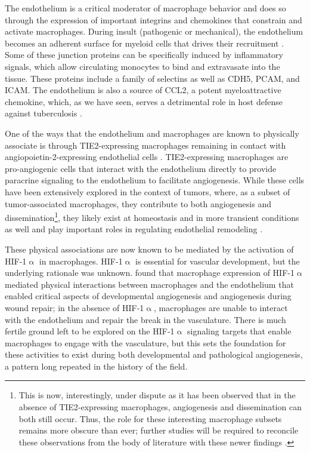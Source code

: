 The endothelium is a critical moderator of macrophage behavior and does so through the expression of important integrins and chemokines that constrain and activate macrophages. During insult (pathogenic or mechanical), the endothelium becomes an adherent surface for myeloid cells that drives their recruitment \citep{Kalucka2017}. Some of these junction proteins can be specifically induced by inflammatory signals, which allow circulating monocytes to bind and extravasate into the tissue. These proteins include a family of selectins as well as CDH5, PCAM, and ICAM. The endothelium is also a source of CCL2, a potent myeloattractive chemokine, which, as we have seen, serves a detrimental role in host defense against tuberculosis \citep{Martin2007, Cambier2014b}. 

One of the ways that the endothelium and macrophages are known to physically associate is through TIE2\hyp{}expressing macrophages remaining in contact with angiopoietin\hyp{}2\hyp{}expressing endothelial cells \citep{Baer2013, DePalma2007, DePalma2011}. TIE2\hyp{}expressing macrophages are pro\hyp{}angiogenic cells that interact with the endothelium directly to provide paracrine signaling to the endothelium to facilitate angiogenesis. While these cells have been extensively explored in the context of tumors, where, as a subset of tumor\hyp{}associated macrophages, they contribute to both angiogenesis and dissemination\footnote{This is now, interestingly, under dispute as it has been observed that in the absence of TIE2\hyp{}expressing macrophages, angiogenesis and dissemination can both still occur. Thus, the role for these interesting macrophage subsets remains more obscure than ever; further studies will be required to reconcile these observations from the body of literature with these newer findings \citep{Jakab2022}.}, they likely exist at homeostasis and in more transient conditions as well and play important roles in regulating endothelial remodeling \citep{Duran2021, Lewis2007}.

These physical associations are now known to be mediated by the activation of HIF\hyp{}1$\upalpha$ in macrophages. HIF\hyp{}1$\upalpha$ is essential for vascular development, but the underlying rationale was unknown. \citet{Gerri2017} found that macrophage expression of HIF\hyp{}1$\upalpha$ mediated physical interactions between macrophages and the endothelium that enabled critical aspects of developmental angiogenesis and angiogenesis during wound repair; in the absence of HIF\hyp{}1$\upalpha$, macrophages are unable to interact with the endothelium and repair the break in the vasculature. There is much fertile ground left to be explored on the HIF\hyp{}1$\upalpha$ signaling targets that enable macrophages to engage with the vasculature, but this sets the foundation for these activities to exist during both developmental and pathological angiogenesis, a pattern long repeated in the history of the field.

